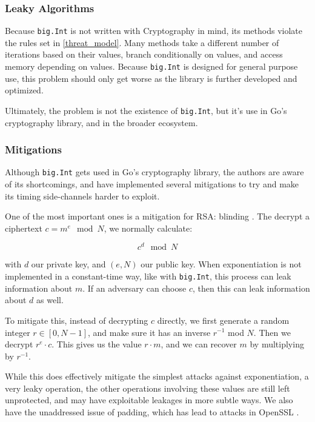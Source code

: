 \documentclass[11pt, a4paper]{article} %
\begin{document}
{\subsubsection{Leaky Algorithms}

Because \texttt{big.Int} is not written with Cryptography in mind,
its methods violate the rules set in
\ref{threat_model}. Many methods take a different number of iterations
based on their values, branch conditionally on values, and
access memory depending on values. Because \texttt{big.Int}
is designed for general purpose use, this problem should only get worse
as the library is further developed and optimized.

Ultimately, the problem is not the existence of \texttt{big.Int},
but it's use in Go's cryptography library, and in the broader ecosystem.

\subsubsection{Mitigations}

Although \texttt{big.Int} gets used in Go's cryptography library,
the authors are aware of its shortcomings, and have implemented
several mitigations to try and make its timing side-channels harder to
exploit.

One of the most important ones is a mitigation
for RSA: blinding \cite{kocher_timing_1996}. The decrypt a ciphertext
$c = m^e \mod N$, we normally calculate:

$$
c^d \mod N
$$

with $d$ our private key, and $(e, N)$ our public key.
When exponentiation is not implemented in a constant-time way, like
with \texttt{big.Int}, this process can leak information about $m$.
If an adversary can choose $c$, then this can leak information about
$d$ as well.

To mitigate this, instead of decrypting $c$ directly,
we first generate a random integer
$r \in [0, N - 1]$, and make sure
it has an inverse $r^{-1}$ mod $N$. Then we decrypt $r^e \cdot c$.
This gives us the value $r \cdot m$, and we can recover
$m$ by multiplying by $r^{-1}$.

While this does effectively mitigate the simplest attacks
against exponentiation, a very leaky operation, the other operations
involving these values are still left unprotected, and may
have exploitable leakages in more subtle ways. We also have
the unaddressed issue of padding, which has lead to attacks
in OpenSSL \cite{merget_raccoon_2019}.

}
\end{document}
